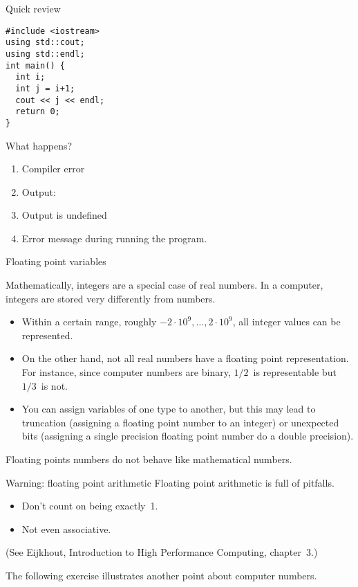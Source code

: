 \begin{exercise}{Quick review}
  \label{q:initvar}
\begin{lstlisting}
#include <iostream>
using std::cout;
using std::endl;
int main() {
  int i;
  int j = i+1;
  cout << j << endl;
  return 0;
}
\end{lstlisting}
What happens?
\begin{enumerate}
\item Compiler error
\item Output: 
\item Output is undefined
\item Error message during running the program.
\end{enumerate}
\end{exercise}

 {Floating point variables}

Mathematically, integers are a special case of real numbers.
In a computer, integers are stored very differently from
 numbers.
\begin{itemize}
\item Within a certain range, roughly
  $-2\cdot 10^9,\ldots,2\cdot 10^9$,
  all integer values can be represented.
\item On the other hand, not all real numbers have a floating point
  representation. For instance, since computer numbers are binary,
  $1/2$~is representable but $1/3$~is not.
\item You can assign variables of one type to another, but this may
  lead to truncation (assigning a floating point number to an integer)
  or unexpected bits (assigning a single precision floating point
  number do a double precision).
\end{itemize}

Floating points numbers do not behave like mathematical numbers. 

\begin{block}{Warning: floating point arithmetic}
  \label{sl:float-arith}
  Floating point arithmetic is full of pitfalls.
  \begin{itemize}
  \item Don't count on  being exactly~1.
  \item Not even associative.
  \end{itemize}
  (See Eijkhout, Introduction to High Performance Computing, chapter~3.)
\end{block}

The following exercise illustrates another point about computer numbers.

